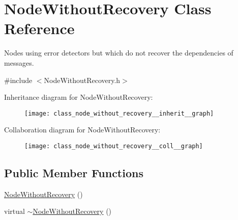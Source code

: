 \hypertarget{class_node_without_recovery}{}\section{Node\+Without\+Recovery Class Reference}
\label{class_node_without_recovery}


Nodes using error detectors but which do not recover the dependencies of messages.  




{\ttfamily \#include $<$Node\+Without\+Recovery.\+h$>$}



Inheritance diagram for Node\+Without\+Recovery\+:\nopagebreak
\begin{figure}[H]
\begin{center}
\leavevmode
\texttt{[image: class\_node\_without\_recovery\_\_inherit\_\_graph]}
\end{center}
\end{figure}


Collaboration diagram for Node\+Without\+Recovery\+:\nopagebreak
\begin{figure}[H]
\begin{center}
\leavevmode
\texttt{[image: class\_node\_without\_recovery\_\_coll\_\_graph]}
\end{center}
\end{figure}
\subsection*{Public Member Functions}
\begin{DoxyCompactItemize}
\item 
\hyperlink{class_node_without_recovery_a81c3fab3d91ae3bd6496b876d16694d8}{Node\+Without\+Recovery} ()
\item 
virtual \hyperlink{class_node_without_recovery_a2690cfda5b6d9998ee873babb3418870}{$\sim$\+Node\+Without\+Recovery} ()
\end{DoxyCompactItemize}
